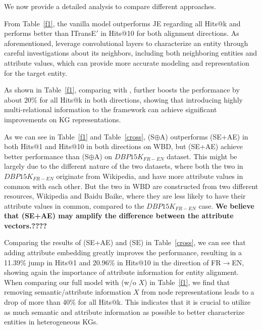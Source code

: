 We now provide a detailed analysis to compare different approaches.

From Table~\ref{f1}, the vanilla \GCN model outperforms JE regarding all Hits@k and performs better than ITransE$'$ in Hits@10 for both alignment directions. As aforementioned, \GCNs leverage convolutional layers to characterize an entity through careful investigations about its neighbors, including both neighboring entities and attribute values, which can provide more accurate modeling and representation for the target entity.

 As shown in Table~\ref{f1}, comparing with \GCN, \RGCN further boosts the performance by about 20\% for all Hits@k in both directions,  %
showing that introducing highly multi-relational information to the \GCN framework can achieve significant improvements on KG representations.

As we can see in Table~\ref{f1} and Table~\ref{cross}, \HRGCN (S$\oplus$A) outperforms \HRGCN (SE+AE) in both Hits@1 and Hits@10 in both directions on WBD, but \HRGCN (SE+AE) achieve better performance than \HRGCN (S$\oplus$A) on $DBP15K_{FR-EN}$ dataset.
This might be largely due to the different nature of the two datasets,
where both the two \KGs in $DBP15K_{FR-EN}$ originate from Wikipedia, and have more attribute values in common with each other.
But the two \KGs in WBD  are constructed  from two different resources, Wikipedia and Baidu Baike,
where they are less likely to have their attribute values in common, compared to the $DBP15K_{FR-EN}$ case.
\textbf{We believe that \HRGCN (SE+AE)  may amplify the difference between the attribute vectors.????}


Comparing the results of \HRGCN (SE+AE) and \HRGCN (SE) in Table~\ref{cross}, we can see that adding attribute embedding greatly improves the performance, resulting in a 11.39\% jump in Hits@1 and  20.96\%  in Hits@10 in the direction of FR$\rightarrow$EN,  showing again the importance of attribute information for entity alignment.
When comparing our full model \HRGCN with \HRGCN (w/o $X$) in Table~\ref{f1}, we find that removing semantic/attribute information  $X$ from node representations leads to a drop of more than 40\% for all Hits@k. This indicates that it is crucial to utilize
as much semantic and attribute information as possible to better characterize entities in heterogeneous KGs.

